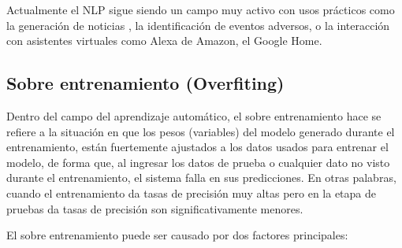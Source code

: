         Actualmente el NLP sigue siendo un campo muy activo con usos prácticos como la generación de noticias \cite{Grover2020}, la identificación de eventos adversos\cite{Young2019NLP}, o la interacción con asistentes virtuales como Alexa de Amazon, el Google Home.
        
    \subsection{Sobre entrenamiento (Overfiting)}
    \label{sub:FrameOverfitting}
    
        Dentro del campo del aprendizaje automático, el sobre entrenamiento hace se refiere a la situación en que los pesos (variables) del modelo generado durante el entrenamiento, están fuertemente ajustados a los datos usados para entrenar el modelo, de forma que, al ingresar los datos de prueba o cualquier dato no visto durante el entrenamiento, el sistema falla en sus predicciones. En otras palabras, cuando el entrenamiento da tasas de precisión muy altas pero en la etapa de pruebas da tasas de precisión son significativamente menores.
        
        El sobre entrenamiento puede ser causado por dos factores principales: 
        
